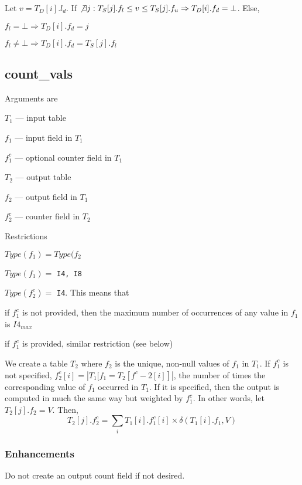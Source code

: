 Let \(v = T_D[i].l_d\). If \(\not \exists j: T_S[j].f_l \leq v \leq
T_S[j].f_u \Rightarrow T_D[i].f_d = \bot\). Else, 
\bi
\item \(f_l = \bot \Rightarrow T_D[i].f_d = j\)
\item \(f_l \neq \bot \Rightarrow T_D[i].f_d = T_S[j].f_l\)
\ei



\subsection{count\_vals}
\label{count_vals}

Arguments are 
\be
\item \(T_1\) --- input table 
\item \(f_1\) --- input field  in \(T_1\)
\item \(f^c_1\) --- optional counter field in \(T_1\)
\item \(T_2\) --- output table 
\item \(f_2\) --- output field in \(T_1\)
\item \(f^c_2\) --- counter field in \(T_2\)
\ee

Restrictions
\be
\item \(Type(f_1) = Type(f_2\)
\item \(Type(f_1) = \) {\tt I4, I8}
\item \(Type(f^c_2) = \) {\tt I4}. This means that 
\be
\item if \(f^c_1\) is not provided, then the maximum number of 
occurrences of any value in \(f_1\) is \(I4_{max}\)
\item if \(f^c_1\) is provided, similar restriction (see below)
\ee
\ee

We create a table \(T_2\) where \(f_2\) is the unique, non-null values
of \(f_1\) in \(T_1\). If \(f^c_1\) is not specified, \(f^c_2[i] =
|T_1[f_1 = T_2[f^c-2[i]]|\), the number of times the corresponding
value of \(f_1\) occurred in \(T_1\). If it is specified, then the
output is computed in much the same way but weighted by \(f^c_1\). In
other words, let \(T_2[j].f_2 = V\). Then, 
\begin{displaymath}
T_2[j].f^c_2 = \sum_i T_1[i].f^c_1[i] \times \delta(T_1[i].f_1, V) 
\end{displaymath}

\subsubsection{Enhancements}
Do not create an output count field if not desired. %

